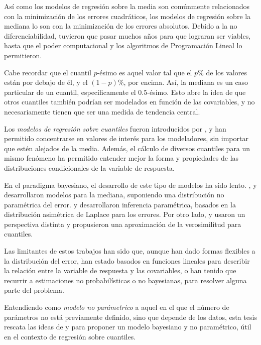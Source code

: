 As\'i como los modelos de regresi\'on sobre la media son com\'unmente relacionados con la minimizaci\'on de los errores cuadr\'aticos, los modelos de regresi\'on sobre la mediana lo son con la minimizaci\'on de los errores absolutos. Debido a la no diferenciabilidad, tuvieron que pasar muchos años para que lograran ser viables, hasta que el poder computacional y los algoritmos de Programaci\'on Lineal lo permitieron.

Cabe recordar que el cuantil $p$-\'esimo es aquel valor tal que el $p\%$ de los valores est\'an por debajo de \'el, y el $(1-p)\%$, por encima. As\'i, la mediana es un caso particular de un cuantil, espec\'ificamente el $0.5$-\'esimo. Esto abre la idea de que otros cuantiles tambi\'en podr\'ian ser modelados en funci\'on de las covariables, y no necesariamente tienen que ser una medida de tendencia central. 

Los \textit{modelos de regresi\'on sobre cuantiles} fueron introducidos por \cite{Koenker_QuantReg}, y han permitido concentrarse en valores de inter\'es para los modeladores, sin importar que est\'en alejados de la media. Adem\'as, el c\'alculo de diversos cuantiles para un mismo fen\'omeno ha permitido entender mejor la forma y propiedades de las distribuciones condicionales de la variable de respuesta.

En el paradigma bayesiano, el desarrollo de este tipo de modelos ha sido lento. \cite{Walker_BayesAccFail}, \cite{Kottas_BaySemiparamMed} y \cite{Hanson_PolyaTrees} desarrollaron modelos para la mediana, suponiendo una distribuci\'on no param\'etrica del error. \cite{Yu_BayQuantReg} y \cite{Tsionas_BayQuantInf} desarrollaron inferencia param\'etrica, basados en la distribuci\'on asim\'etrica de Laplace para los errores. Por otro lado, \cite{Lavine_LikeQuant} y \cite{Dunson_ApproxBayes} usaron un perspectiva distinta y propusieron una aproximaci\'on de la verosimilitud para cuantiles.

Las limitantes de estos trabajos han sido que, aunque han dado formas flexibles a la distribuci\'on del error, han estado basados en funciones lineales para describir la relaci\'on entre la variable de respuesta y las covariables, o han tenido que recurrir a estimaciones no probabil\'isticas o no bayesianas, para resolver alguna parte del problema.

Entendiendo como \textit{modelo no par\'ametrico} a aquel en el que el n\'umero de par\'ametros no est\'a previamente definido, sino que depende de los datos, esta tesis rescata las ideas de \cite{Kottas_NotParamQuantReg} y \cite{Kottas_SemiparamQuantReg} para proponer un modelo bayesiano y no param\'etrico, \'util en el contexto de regresi\'on sobre cuantiles.

\newpage